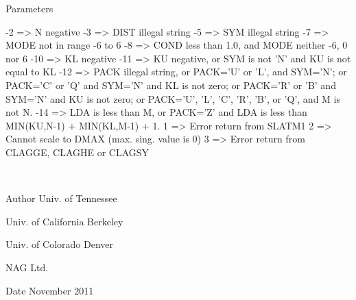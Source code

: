 \begin{DoxyParams}[1]{Parameters}
\begin{DoxyVerb}
            -2 => N negative
            -3 => DIST illegal string
            -5 => SYM illegal string
            -7 => MODE not in range -6 to 6
            -8 => COND less than 1.0, and MODE neither -6, 0 nor 6
           -10 => KL negative
           -11 => KU negative, or SYM is not 'N' and KU is not equal to
                  KL
           -12 => PACK illegal string, or PACK='U' or 'L', and SYM='N';
                  or PACK='C' or 'Q' and SYM='N' and KL is not zero;
                  or PACK='R' or 'B' and SYM='N' and KU is not zero;
                  or PACK='U', 'L', 'C', 'R', 'B', or 'Q', and M is not
                  N.
           -14 => LDA is less than M, or PACK='Z' and LDA is less than
                  MIN(KU,N-1) + MIN(KL,M-1) + 1.
            1  => Error return from SLATM1
            2  => Cannot scale to DMAX (max. sing. value is 0)
            3  => Error return from CLAGGE, CLAGHE or CLAGSY\end{DoxyVerb}
 \\
\hline
\end{DoxyParams}
\begin{DoxyAuthor}{Author}
Univ. of Tennessee 

Univ. of California Berkeley 

Univ. of Colorado Denver 

N\+A\+G Ltd. 
\end{DoxyAuthor}
\begin{DoxyDate}{Date}
November 2011 
\end{DoxyDate}
\hypertarget{group__complex__matgen_gacbcffc07d8119265fdd7ec81f961e75a}{}
